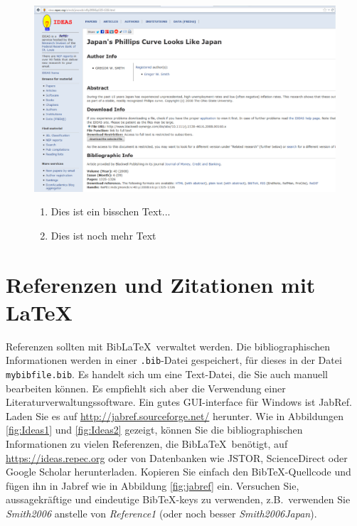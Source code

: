 \documentclass[a4paper,12pt]{scrartcl} %
\begin{document}
\begin{figure}[tbp!]
    \begin{minipage}{0.6\linewidth}
        \includegraphics[width=1.0\linewidth]{Ideas} %
    \end{minipage}
    \begin{minipage}{0.3\linewidth}
        \begin{enumerate} %
            \item Dies ist ein bisschen Text...
            \item Dies ist noch mehr Text
        \end{enumerate}
    \end{minipage}
\end{figure}

\clearpage

\section{Referenzen und Zitationen mit \LaTeX}
Referenzen sollten mit Bib\LaTeX\ verwaltet werden. Die bibliographischen Informationen werden in einer \texttt{.bib}-Datei gespeichert, für dieses in der Datei \texttt{mybibfile.bib}. Es handelt sich um eine Text-Datei, die Sie auch manuell bearbeiten können. Es empfiehlt sich aber die Verwendung einer Literaturverwaltungssoftware. Ein gutes GUI-interface für Windows ist JabRef. Laden Sie es auf \url{http://jabref.sourceforge.net/} herunter. Wie in Abbildungen \ref{fig:Ideas1} und \ref{fig:Ideas2} gezeigt, können Sie die bibliographischen Informationen zu vielen Referenzen, die Bib\LaTeX\ benötigt, auf \url{https://ideas.repec.org} oder von Datenbanken wie JSTOR, ScienceDirect oder Google Scholar herunterladen. Kopieren Sie einfach den Bib\TeX-Quellcode und fügen ihn in Jabref wie in Abbildung \ref{fig:jabref} ein. Versuchen Sie, aussagekräftige und eindeutige Bib\TeX-keys zu verwenden, z.B.\ verwenden Sie \textit{Smith2006} anstelle von \textit{Reference1} (oder noch besser \textit{Smith2006Japan}).
\end{document}
